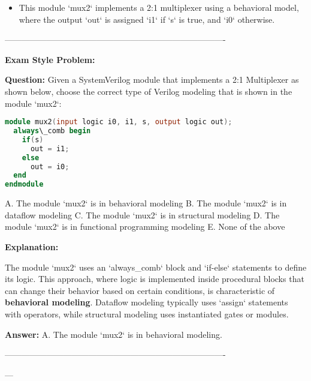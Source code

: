 \documentclass{article}
\begin{document}
\begin{itemize}
\begin{itemize}
        \item This module `mux2` implements a 2:1 multiplexer using a behavioral model, where the output `out` is assigned `i1` if `s` is true, and `i0` otherwise.
    \end{itemize}
\end{itemize}

\-------------------------------------------------------------------------------- 

\textbf{Exam Style Problem:}

\textbf{Question:} Given a SystemVerilog module that implements a 2:1 Multiplexer as shown below, choose the correct type of Verilog modeling that is shown in the module `mux2`:

\begin{lstlisting}[language=Verilog]
module mux2(input logic i0, i1, s, output logic out);
  always\_comb begin
    if(s)
      out = i1;
    else
      out = i0;
  end
endmodule
\end{lstlisting}

A. The module `mux2` is in behavioral modeling B. The module `mux2` is in dataflow modeling C. The module `mux2` is in structural modeling D. The module `mux2` is in functional programming modeling E. None of the above

\textbf{Explanation:}

The module `mux2` uses an `always\_comb` block and `if-else` statements to define its logic. This approach, where logic is implemented inside procedural blocks that can change their behavior based on certain conditions, is characteristic of \textbf{behavioral modeling}. Dataflow modeling typically uses `assign` statements with operators, while structural modeling uses instantiated gates or modules.

\textbf{Answer:} A. The module `mux2` is in behavioral modeling.

\--------------------------------------------------------------------------------

---
\end{document}
